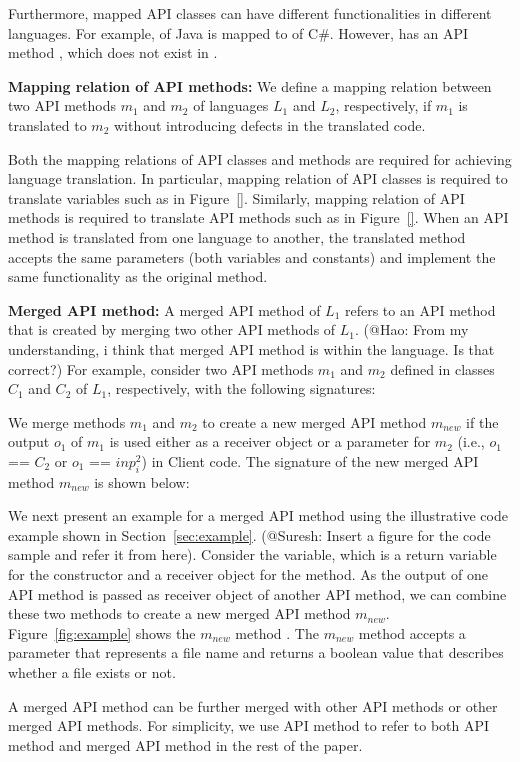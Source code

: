Furthermore, mapped API classes can have different functionalities in different
languages. For example,  of Java is mapped to  
of C\#. However,  has an API method 
, which does not exist in .

\textbf{Mapping relation of API methods:} We define a mapping relation
between two API methods $m_1$ and $m_2$ of languages $L_1$ and $L_2$,
respectively, if $m_1$ is translated to $m_2$ without introducing defects 
in the translated code.

Both the mapping relations of API classes and methods are required for
achieving language translation. In particular, mapping relation of API classes is
required to translate variables such as  in Figure~\ref{}.
Similarly, mapping relation of API methods is
required to translate API methods such as  in Figure~\ref{}.
When an API method is translated from one language to another, the translated
method accepts the same parameters (both variables and constants) and implement
the same functionality as the original method.

\textbf{Merged API method:} A merged API method of $L_1$ refers to an API method
that is created by merging two other API methods of $L_1$. (@Hao: From my
understanding, i think that merged API method is within the language. Is that correct?)
For example, consider two API methods $m_1$ and $m_2$ defined in classes
$C_1$ and $C_2$ of $L_1$, respectively, with the
following signatures:



We merge methods $m_1$ and $m_2$ to create a new merged API method $m_{new}$ if the
output $o_1$ of $m_1$ is used either as a receiver object or a 
parameter for $m_2$ (i.e., $o_1$ == $C_2$ or $o_1$ == $inp_i^2$)
in Client code. The signature of the new merged API method $m_{new}$ is 
shown below:


We next present an example for a merged API method using the
illustrative code example shown in Section~\ref{sec:example}. (@Suresh:
Insert a figure for the code sample and refer it from here).
Consider the  variable, which is a return variable
for the constructor and a receiver object for the  method.
As the output of one API method is passed as receiver object of
another API method, we can combine these two methods to create a new
merged API method $m_{new}$. Figure~\ref{fig:example} shows 
the $m_{new}$ method . The $m_{new}$
method accepts a  parameter that represents a file name
and returns a boolean value that describes whether a file exists or not. 

A merged API method can be further merged with other API methods or 
other merged API methods. For simplicity, we use API method to refer
to both API method and merged API method in the rest of the paper.